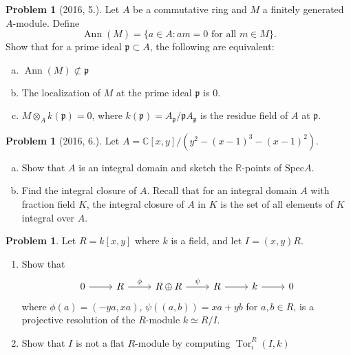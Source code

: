 \documentclass{article}
\newcommand{\C}{\mathbb{C}} %
\newcommand{\<}{\langle} %
\renewcommand{\>}{\rangle} %
\newcommand{\R}{\mathbb{R}} %
\DeclareMathOperator{\Ann}{Ann}
\DeclareMathOperator{\Tor}{Tor}
\theoremstyle{plain}
\theoremstyle{remark}
\theoremstyle{definition}
\newtheorem{examproblem}[equation]{Problem}
\begin{document}
\begin{examproblem}[2016, 5.]
    Let $A$ be a commutative ring and $M$ a finitely generated $A$-module. Define
    \[ \Ann(M) = \{a \in A: am = 0 \text{ for all } m \in M\}.\]
    Show that for a prime ideal $\mathfrak p \subset A$, the following are equivalent:
    \begin{enumerate}[(a)]
        \item $\Ann(M) \not\subset \mathfrak p$
        \item The localization of $M$ at the prime ideal $\mathfrak p$ is $0$.
        \item $M \otimes_A k(\mathfrak p) = 0$, where $k(\mathfrak p) = A_{\mathfrak p}/\mathfrak p A_{\mathfrak p}$ is the residue field of $A$ at $\mathfrak p$.
    \end{enumerate}
\end{examproblem}

\begin{examproblem}[2016, 6.]
  Let $A = \C[x,y]/(y^2-(x-1)^3 - (x-1)^2)$.
  \begin{enumerate}[(a)]
      \item Show that $A$ is an integral domain and sketch the $\R$-points of $\text{Spec} A$.
      \item Find the integral closure of $A$. Recall that for an integral domain $A$ with fraction field $K$, the integral closure of $A$ in $K$ is the set of all elements of $K$ integral over $A$.
  \end{enumerate}
\end{examproblem}

\begin{examproblem}
    Let $R = k[x,y]$ where $k$ is a field, and let $I=(x,y)R$.
    \begin{enumerate}
        \item Show that
        \[
        \begin{tikzcd}
        0 \ar[r] & R \arrow[r,"\phi"] & R \oplus R \arrow[r,"\psi"] & R \arrow[r] & k \arrow[r] & 0
        \end{tikzcd}
        \]
        where $\phi(a) = (-ya,xa)$, $\psi((a,b)) = xa+yb$ for $a,b \in R$, is a projective resolution of the $R$-module $k \simeq R/I$.
        \item Show that $I$ is not a flat $R$-module by computing $\Tor_i^R(I,k)$
    \end{enumerate}
\end{examproblem}


\pagebreak
\end{document}
